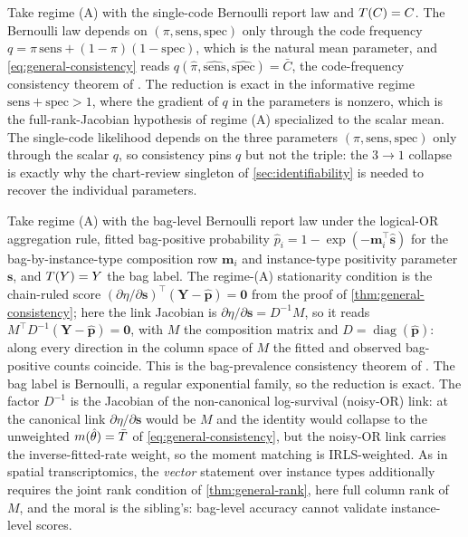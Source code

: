\begin{corollary}
\label{cor:phenotype}
Take regime (A) with the single-code Bernoulli report law and $T(C) =
C$. The Bernoulli law depends on $(\pi, \mathrm{sens}, \mathrm{spec})$
only through the code frequency $q = \pi\,\mathrm{sens} +
(1-\pi)(1-\mathrm{spec})$, which is the natural mean parameter, and
\eqref{eq:general-consistency} reads $q(\hat\pi,
\widehat{\mathrm{sens}}, \widehat{\mathrm{spec}}) = \bar C$, the
code-frequency consistency theorem of
\citet{towell2026phenotypecoarsening}. The reduction is exact in the
informative regime $\mathrm{sens} + \mathrm{spec} > 1$, where the
gradient of $q$ in the parameters is nonzero, which is the
full-rank-Jacobian hypothesis of regime (A) specialized to the scalar
mean. The single-code likelihood depends on the three parameters
$(\pi, \mathrm{sens}, \mathrm{spec})$ only through the scalar $q$, so
consistency pins $q$ but not the triple: the $3 \to 1$ collapse is
exactly why the chart-review singleton of \cref{sec:identifiability} is
needed to recover the individual parameters.
\end{corollary}

\begin{corollary}
\label{cor:mil}
Take regime (A) with the bag-level Bernoulli report law under the
logical-OR aggregation rule, fitted bag-positive probability $\hat p_i =
1 - \exp(-\bm m_i^\top \hat{\bm s})$ for the bag-by-instance-type
composition row $\bm m_i$ and instance-type positivity parameter
$\bm s$, and $T(Y) = Y$ the bag label. The regime-(A) stationarity
condition is the chain-ruled score $(\partial\eta/\partial\bm s)^\top(\bm
Y - \hat{\bm p}) = \bm 0$ from the proof of \cref{thm:general-consistency};
here the link Jacobian is $\partial\eta/\partial\bm s = D^{-1}M$, so it
reads $M^\top D^{-1}(\bm Y - \hat{\bm p}) = \bm 0$, with $M$ the
composition matrix and $D = \operatorname{diag}(\hat{\bm p})$: along every
direction in the column space of $M$ the fitted and observed bag-positive
counts coincide. This is the bag-prevalence consistency theorem of
\citet{towell2026milcoarsening}. The bag label is Bernoulli, a regular
exponential family, so the reduction is exact. The factor $D^{-1}$ is the
Jacobian of the non-canonical log-survival (noisy-OR) link: at the
canonical link $\partial\eta/\partial\bm s$ would be $M$ and the identity
would collapse to the unweighted $m(\hat\theta) = \bar{T}$ of
\eqref{eq:general-consistency}, but the noisy-OR link carries the
inverse-fitted-rate weight, so the moment matching is IRLS-weighted. As in
spatial transcriptomics, the \emph{vector} statement over instance types
additionally requires the joint rank condition of \cref{thm:general-rank},
here full column rank of $M$, and the moral is the sibling's: bag-level
accuracy cannot validate instance-level scores.
\end{corollary}

